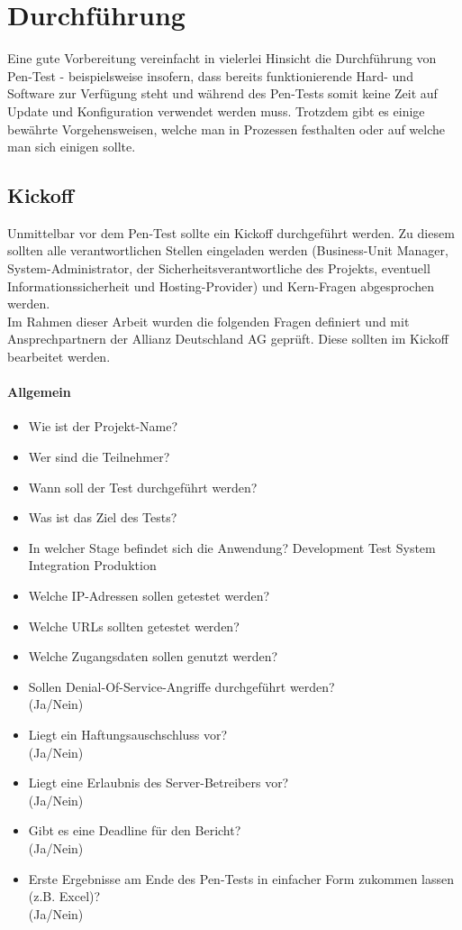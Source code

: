 \section{Durchführung}
Eine gute Vorbereitung vereinfacht in vielerlei Hinsicht die Durchführung von Pen-Test - beispielsweise insofern, dass bereits funktionierende Hard- und Software zur Verfügung steht und während des Pen-Tests somit keine Zeit auf Update und Konfiguration verwendet werden muss. Trotzdem gibt es einige bewährte Vorgehensweisen, welche man in Prozessen festhalten oder auf welche man sich einigen sollte. 

	\subsection{Kickoff}\label{ref:PenProzKickoffWeb}
	Unmittelbar vor dem Pen-Test sollte ein Kickoff durchgeführt werden. Zu diesem sollten alle verantwortlichen Stellen eingeladen werden (Business-Unit Manager, System-Administrator, der Sicherheitsverantwortliche des Projekts, eventuell Informationssicherheit und Hosting-Provider) und Kern-Fragen abgesprochen werden.\\
	
	Im Rahmen dieser Arbeit wurden die folgenden Fragen definiert und mit Ansprechpartnern der Allianz Deutschland AG geprüft. Diese sollten im Kickoff bearbeitet werden.
			
\paragraph{Allgemein}
\begin{itemize}
	\item Wie ist der Projekt-Name?
	\item Wer sind die Teilnehmer?
	\item Wann soll der Test durchgeführt werden?
	\item Was ist das Ziel des Tests?
	\item In welcher Stage befindet sich die Anwendung? Development Test System Integration Produktion
	\item Welche IP-Adressen sollen getestet werden?
	\item Welche URLs sollten getestet werden?
	\item Welche Zugangsdaten sollen genutzt werden?
	\item Sollen Denial-Of-Service-Angriffe durchgeführt werden?\\
	(Ja/Nein)
	\item Liegt ein Haftungsauschschluss vor?\\
	(Ja/Nein)
	\item Liegt eine Erlaubnis des Server-Betreibers vor?\\
	(Ja/Nein)
	\item Gibt es eine Deadline für den Bericht?\\
	(Ja/Nein)
	\item Erste Ergebnisse am Ende des Pen-Tests in einfacher Form zukommen lassen (z.B. Excel)?\\
	(Ja/Nein)
\end{itemize}


